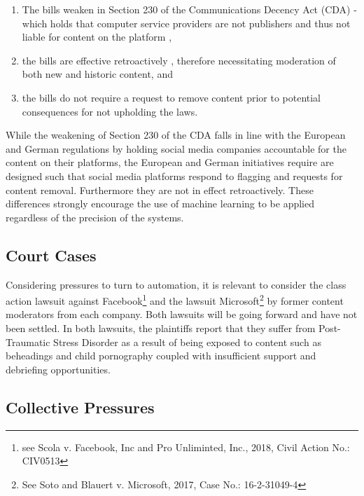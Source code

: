 \begin{enumerate}
  \item{The bills weaken \citep{Romano:2018,Stryker:2018} in Section 230 of the Communications Decency Act (CDA) - which holds that computer service providers are not publishers and thus not liable for content on the platform \citep{EFF:230},}
  \item{the bills are effective retroactively \citep{Stryker:2018}, therefore necessitating moderation of both new and historic content, and}
  \item{the bills do not require a request to remove content prior to potential consequences for not upholding the laws.}
\end{enumerate}

While the weakening of Section 230 of the CDA falls in line with the European and German regulations by holding social media companies accountable for the content on their platforms, the European and German initiatives require are designed such that social media platforms respond to flagging and requests for content removal. Furthermore they are not in effect retroactively. These differences strongly encourage the use of machine learning to be applied regardless of the precision of the systems.\vspace{5mm}

\subsection{Court Cases}  

Considering pressures to turn to automation, it is relevant to consider the class action lawsuit against Facebook\footnote{see Scola v. Facebook, Inc and Pro Unliminted, Inc., 2018, Civil Action No.: CIV0513} and the lawsuit Microsoft\footnote{See Soto and Blauert v. Microsoft, 2017, Case No.: 16-2-31049-4} by former content moderators from each company. Both lawsuits will be going forward and have not been settled. In both lawsuits, the plaintiffs report that they suffer from Post-Traumatic Stress Disorder as a result of being exposed to content such as beheadings and child pornography coupled with insufficient support and debriefing opportunities.

\subsection{Collective Pressures} 

